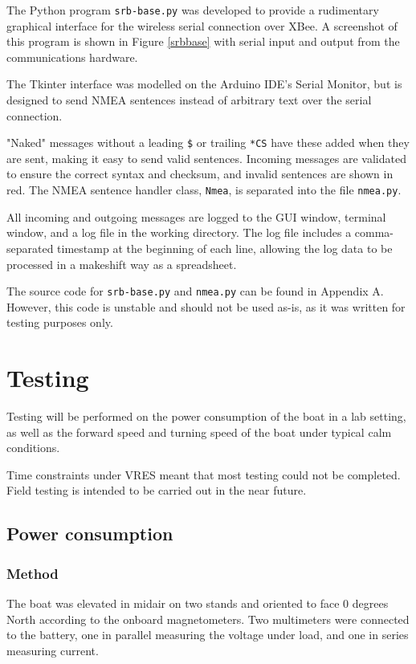 \documentclass[a4paper]{IEEEtran}
\begin{document}
The Python program \texttt{srb-base.py} was developed to provide a rudimentary graphical interface for the wireless serial connection over XBee. A screenshot of this program is shown in Figure \ref{srbbase} with serial input and output from the communications hardware.

The Tkinter interface was modelled on the Arduino IDE's Serial Monitor, but is designed to send NMEA sentences instead of arbitrary text over the serial connection.

"Naked" messages without a leading \texttt{\$} or trailing \texttt{*CS} have these added when they are sent, making it easy to send valid sentences. Incoming messages are validated to ensure the correct syntax and checksum, and invalid sentences are shown in red. The NMEA sentence handler class, \texttt{Nmea}, is separated into the file \texttt{nmea.py}.

All incoming and outgoing messages are logged to the GUI window, terminal window, and a log file in the working directory. The log file includes a comma-separated timestamp at the beginning of each line, allowing the log data to be processed in a makeshift way as a spreadsheet.

The source code for \texttt{srb-base.py} and \texttt{nmea.py} can be found in Appendix A. However, this code is unstable and should not be used as-is, as it was written for testing purposes only.

\section{Testing}
Testing will be performed on the power consumption of the boat in a lab setting, as well as the forward speed and turning speed of the boat under typical calm conditions.

Time constraints under VRES meant that most testing could not be completed. Field testing is intended to be carried out in the near future.

\subsection{Power consumption}

\subsubsection{Method}
The boat was elevated in midair on two stands and oriented to face 0 degrees North according to the onboard magnetometers. Two multimeters were connected to the battery, one in parallel measuring the voltage under load, and one in series measuring current.
\end{document}
